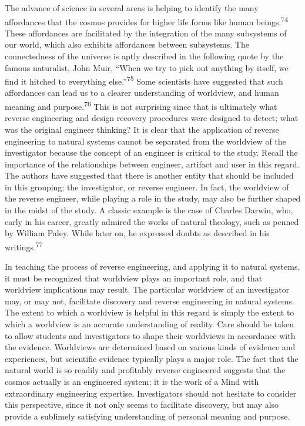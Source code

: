 The advance of science in several areas is helping to identify the many
affordances that the cosmos provides for higher life forms like human
beings.\textsuperscript{74} These affordances are facilitated by the
integration of the many subsystems of our world, which also exhibits
affordances between subsystems. The connectedness of the universe is
aptly described in the following quote by the famous naturalist, John
Muir, “When we try to pick out anything by itself, we find it hitched
to everything else.”\textsuperscript{75} Some scientists have suggested
that such affordances can lead us to a clearer understanding of
worldview, and human meaning and purpose.\textsuperscript{76} This is
not surprising since that is ultimately what reverse engineering and
design recovery procedures were designed to detect; what was the
original engineer thinking? It is clear that the application of reverse
engineering to natural systems cannot be separated from the worldview
of the investigator because the concept of an engineer is critical to
the study. Recall the importance of the relationships between engineer,
artifact and user in this regard. The authors have suggested that there
is another entity that should be included in this grouping; the
investigator, or reverse engineer. In fact, the worldview of the
reverse engineer, while playing a role in the study, may also be
further shaped in the midst of the study. A classic example is the case
of Charles Darwin, who, early in his career, greatly admired the works
of natural theology, such as penned by William Paley. While later on,
he expressed doubts as described in his writings.\textsuperscript{77} 


In teaching the process of reverse engineering, and applying it to
natural systems, it must be recognized that worldview plays an
important role, and that worldview implications may result. The
particular worldview of an investigator may, or may not, facilitate
discovery and reverse engineering in natural systems. The extent to
which a worldview is helpful in this regard is simply the extent to
which a worldview is an accurate understanding of reality. Care should
be taken to allow students and investigators to shape their worldviews
in accordance with the evidence. Worldviews are determined based on
various kinds of evidence and experiences, but scientific evidence
typically plays a major role. The fact that the natural world is so
readily and profitably reverse engineered suggests that the cosmos
actually is an engineered system; it is the work of a Mind with
extraordinary engineering expertise. Investigators should not hesitate
to consider this perspective, since it not only seems to facilitate
discovery, but may also provide a sublimely satisfying understanding of
personal meaning and purpose.



